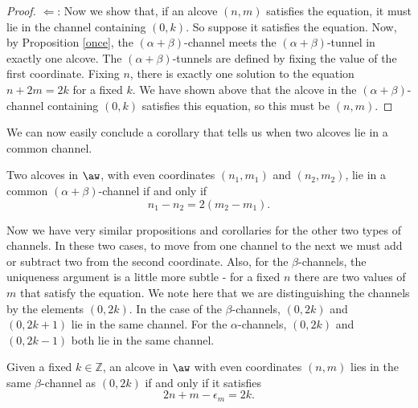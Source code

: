 \documentclass[11pt]{article}
\begin{document}
\begin{proof}
    $\Leftarrow$: Now we show that, if an alcove $(n,m)$ satisfies the equation, it must lie in the channel containing $(0,k)$. So suppose it satisfies the equation.  Now, by Proposition \ref{once}, the $(\alpha+\beta)$-channel meets the $(\alpha+\beta)$-tunnel in exactly one alcove. The $(\alpha+\beta)$-tunnels are defined by fixing the value of the first coordinate.  Fixing $n$, there is exactly one solution to the equation $n+2m=2k$ for a fixed $k$. We have shown above that the alcove in the $(\alpha+\beta)$-channel containing $(0,k)$ satisfies this equation, so this must be $(n,m)$. 
\end{proof}

We can now easily conclude a corollary that tells us when two alcoves lie in a common channel. 

\begin{corollary}
    Two alcoves in $\aw$, with even coordinates $(n_1,m_1)$ and $(n_2,m_2)$, lie in a common $(\alpha+\beta)$-channel if and only if
    \[n_1-n_2=2(m_2-m_1).\]
\end{corollary}


Now we have very similar propositions and corollaries for the other two types of channels. In these two cases, to move from one channel to the next we must add or subtract two from the second coordinate. Also, for the $\beta$-channels, the uniqueness argument is a little more subtle - for a fixed $n$ there are two values of $m$ that satisfy the equation. We note here that we are distinguishing the channels by the elements $(0,2k)$. In the case of the $\beta$-channels, $(0,2k)$ and $(0,2k+1)$ lie in the same channel. For the $\alpha$-channels, $(0,2k)$ and $(0,2k-1)$ both lie in the same channel. 

\begin{proposition}
    

    Given a fixed $k\in \mathbb{Z}$, an alcove in $\aw$ with even coordinates $(n,m)$ lies in the same $\beta$-channel as $(0,2k)$ if and only if it satisfies 
    \[2n+m-\epsilon_m=2k.\]
\end{proposition}
\end{document}
